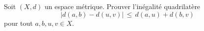 
\begin{exercice}\label{exo0082}

Soit $(X,d)$ un espace métrique. Prouver l'inégalité quadrilatère
\begin{equation}
	\left| d(a,b)-d(u,v) \right| \,\le\, d(a,u) + d(b,v)
\end{equation}
pour tout $a,b,u,v \in X$.

\end{exercice}
